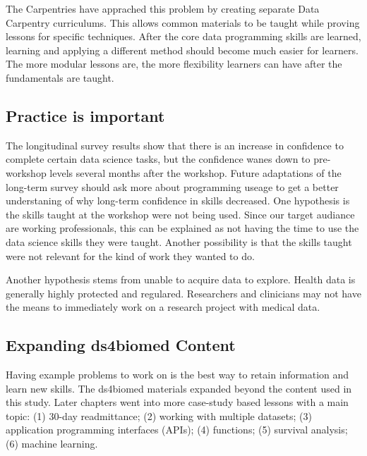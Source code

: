 \documentclass[020-persona_validation.tex]{subfiles}
\begin{document}
        The Carpentries have apprached this problem by creating separate Data Carpentry curriculums.
        This allows common materials to be taught while proving lessons for specific techniques.
        After the core data programming skills are learned,
        learning and applying a different method should become much easier for learners.
        The more modular lessons are, the more flexibility learners can have after the fundamentals are taught.

    \subsection{Practice is important}

        The longitudinal survey results show that there is an increase in confidence to complete certain data science tasks,
        but the confidence wanes down to pre-workshop levels several months after the workshop.
        Future adaptations of the long-term survey should ask more about programming useage to get a better understaning
        of why long-term confidence in skills decreased.
        One hypothesis is the skills taught at the workshop were not being used.
        Since our target audiance are working professionals,
        this can be explained as not having the time to use the data science skills they were taught.
        Another possibility is that the skills taught were not relevant for the kind of work they wanted to do.

        Another hypothesis stems from unable to acquire data to explore.
        Health data is generally highly protected and regulared.
        Researchers and clinicians may not have the means to immediately work on a research project with medical data.

        \subsection{Expanding ds4biomed Content}

            Having example problems to work on is the best way to retain information and learn new skills.
            The ds4biomed materials expanded beyond the content used in this study.
            Later chapters went into more case-study based lessons with a main topic:
            (1) 30-day readmittance;
            (2) working with multiple datasets;
            (3) application programming interfaces (APIs);
            (4) functions;
            (5) survival analysis;
            (6) machine learning.
\end{document}
